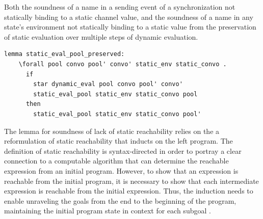 \documentclass[10pt]{article}
\begin{document}
Both the soundness of a name in a sending event of a synchronization not statically binding
to a static
channel value, and the soundness of a name in any state's environment not statically binding
to a static value from the preservation of static evaluation over multiple steps of dynamic
evaluation.

\begin{lstlisting}[language=logic, mathescape]
  lemma static_eval_pool_preserved:
    \forall pool convo pool' convo' static_env static_convo .
      if
        star dynamic_eval pool convo pool' convo' 
        static_eval_pool static_env static_convo pool
      then
        static_eval_pool static_env static_convo pool'
\end{lstlisting}

The lemma for soundness of lack of static reachability relies on the a reformulation of
static reachability that inducts on the left program.
The definition of static reachability is syntax-directed in
order to portray a clear connection to
a computable algorithm that can determine the reachable expression from an initial program.
However, to show that an expression is reachable from the initial program, it is necessary to
show that each intermediate expression is reachable from the initial expression.  Thus, the
induction needs to enable unraveling the goals from the end to the beginning of the program,
maintaining the initial program state in context for each subgoal .
\end{document}
